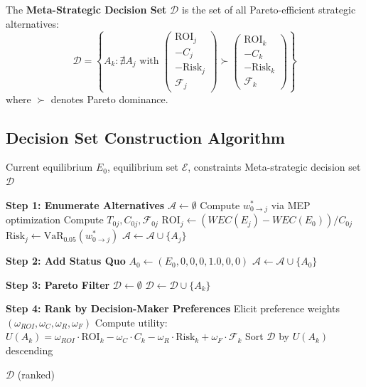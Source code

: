\begin{definition}
The \textbf{Meta-Strategic Decision Set} $\mathcal{D}$ is the set of all
Pareto-efficient strategic alternatives:
\begin{equation}
\boxed{
\mathcal{D} = \left\{ A_k : \nexists A_j \text{ with }
\begin{pmatrix} \text{ROI}_j \\ -C_j \\ -\text{Risk}_j \\ \mathcal{F}_j \end{pmatrix}
\succ
\begin{pmatrix} \text{ROI}_k \\ -C_k \\ -\text{Risk}_k \\ \mathcal{F}_k \end{pmatrix}
\right\}
}
\end{equation}
where $\succ$ denotes Pareto dominance.
\end{definition}

\subsection{Decision Set Construction Algorithm}

\begin{algorithm}[H]
\caption{Meta-Strategic Decision Set Construction (DECIDE)}
\label{alg:decision}
\begin{algorithmic}[1]
\Require Current equilibrium $E_0$, equilibrium set $\mathcal{E}$, constraints
\Ensure Meta-strategic decision set $\mathcal{D}$

\State \textbf{Step 1: Enumerate Alternatives}
\State $\mathcal{A} \gets \emptyset$
    \State Compute $w^*_{0 \to j}$ via MEP optimization
    \State Compute $T_{0j}, C_{0j}, \mathcal{F}_{0j}$
    \State $\text{ROI}_j \gets (WEC(E_j) - WEC(E_0)) / C_{0j}$
    \State $\text{Risk}_j \gets \text{VaR}_{0.05}(w^*_{0 \to j})$
    \State $\mathcal{A} \gets \mathcal{A} \cup \{A_j\}$
\EndFor

\State \textbf{Step 2: Add Status Quo}
\State $A_0 \gets (E_0, 0, 0, 0, 1.0, 0, 0)$ 
\State $\mathcal{A} \gets \mathcal{A} \cup \{A_0\}$

\State \textbf{Step 3: Pareto Filter}
\State $\mathcal{D} \gets \emptyset$
        \State $\mathcal{D} \gets \mathcal{D} \cup \{A_k\}$
    \EndIf
\EndFor

\State \textbf{Step 4: Rank by Decision-Maker Preferences}
\State Elicit preference weights $(\omega_{ROI}, \omega_C, \omega_R, \omega_F)$
\State Compute utility: $U(A_k) = \omega_{ROI} \cdot \text{ROI}_k - \omega_C \cdot C_k - \omega_R \cdot \text{Risk}_k + \omega_F \cdot \mathcal{F}_k$
\State Sort $\mathcal{D}$ by $U(A_k)$ descending

\Return $\mathcal{D}$ (ranked)
\end{algorithmic}
\end{algorithm}


